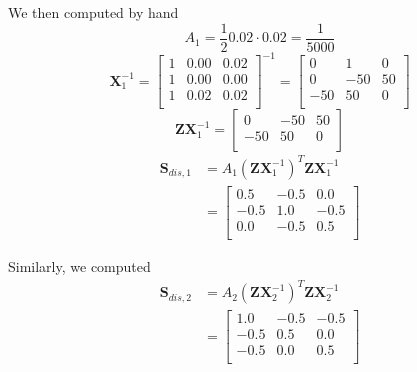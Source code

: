 \documentclass[journal,hidelinks]{IEEEtran}
\begin{document}
We then computed by hand
\begin{equation}
A_1 = \frac{1}{2} 0.02 \cdot 0.02 = \frac{1}{5000}
\end{equation}
\begin{equation}
\boldsymbol{X}^{-1}_1 =
\begin{bmatrix}
1 & 0.00 & 0.02 \\
1 & 0.00 & 0.00 \\
1 & 0.02 & 0.02 \\
\end{bmatrix}^{-1} =
\begin{bmatrix}
0 & 1 & 0\\
0 & -50 & 50 \\
-50 & 50 & 0 \\
\end{bmatrix}
\end{equation}
\begin{equation}
\boldsymbol{Z} \boldsymbol{X}^{-1}_1 =
\begin{bmatrix}
0 & -50 & 50 \\
-50 & 50 & 0 \\
\end{bmatrix}
\end{equation}
\begin{align}
\boldsymbol{S}_{dis,1} &= A_1 (\boldsymbol{Z} \boldsymbol{X}^{-1}_1)^T \boldsymbol{Z} \boldsymbol{X}^{-1}_1 \\
&= \begin{bmatrix}
0.5 & -0.5 & 0.0 \\
-0.5 & 1.0 & -0.5 \\
0.0 & -0.5 & 0.5 \\
\end{bmatrix}
\end{align}

Similarly, we computed
\begin{align}
\boldsymbol{S}_{dis,2} &= A_2 (\boldsymbol{Z} \boldsymbol{X}^{-1}_2)^T \boldsymbol{Z} \boldsymbol{X}^{-1}_2 \\
&= \begin{bmatrix}
1.0 & -0.5 & -0.5 \\
-0.5 & 0.5 & 0.0 \\
-0.5 & 0.0 & 0.5 \\
\end{bmatrix}
\end{align}
\end{document}
